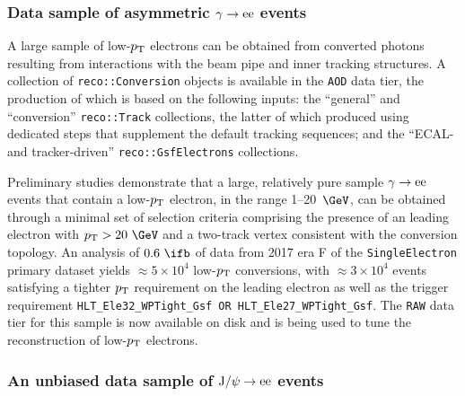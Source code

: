 \subsubsection{Data sample of asymmetric
  \texorpdfstring{$\gamma\to\mathrm{ee}$}{conversion} events}

A large sample of low-$p_\mathrm{T}$ electrons can be obtained from converted
photons resulting from interactions with the beam pipe and inner
tracking structures. A collection of \verb!reco::Conversion! objects
is available in the \verb!AOD! data tier, the production of which is
based on the following inputs: the ``general'' and ``conversion''
\verb!reco::Track!  collections, the latter of which produced using
dedicated steps that supplement the default tracking sequences; and
the ``ECAL- and tracker-driven'' \verb!reco::GsfElectrons!
collections.

Preliminary studies demonstrate that a large, relatively pure sample
$\gamma\to\mathrm{ee}$ events that contain a low-$p_\mathrm{T}$ electron, in the range
1--20~$\GeV$, can be obtained through a minimal set of selection
criteria comprising the presence of an leading electron with $\pt >
20~\GeV$ and a two-track vertex consistent with the conversion
topology. An analysis of $0.6~\ifb$ of data from 2017 era F of the
\verb!SingleElectron! primary dataset yields ${\approx}5 \times 10^4$
low-$p_\mathrm{T}$ conversions, with ${\approx}3 \times 10^4$ events satisfying
a tighter $p_\mathrm{T}$ requirement on the leading electron as well as the
trigger requirement \texttt{HLT\_Ele32\_WPTight\_Gsf OR
  HLT\_Ele27\_WPTight\_Gsf}. The \verb!RAW! data tier for this sample
is now available on disk and is being used to tune the reconstruction
of low-$p_\mathrm{T}$ electrons.


\subsubsection{An unbiased data sample of
  \texorpdfstring{$\mathrm{J/}\psi\to\mathrm{ee}$}{J/psi} events}
\label{sec:jpsi_from_pu_sample}

